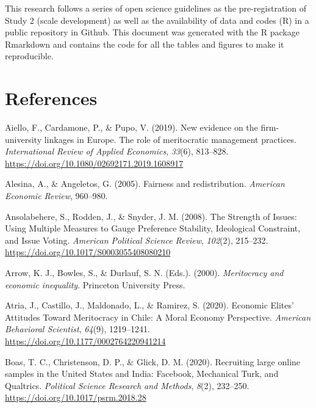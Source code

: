 \documentclass[
  10pt,
  a4paper,
]{article}
\newlength{\cslhangindent}
\newenvironment{CSLReferences}[2] %
 {\begin{list}{}{%
  \setlength{\itemindent}{0pt}
  \setlength{\leftmargin}{0pt}
  \setlength{\parsep}{0pt}
  \ifodd #1
   \setlength{\leftmargin}{\cslhangindent}
   \setlength{\itemindent}{-1\cslhangindent}
  \fi
  \setlength{\itemsep}{#2\baselineskip}}}
 {\end{list}}
\begin{document}
This research follows a series of open science guidelines as the pre-registration of Study 2 (scale development) as well as the availability of data and codes (R) in a public repository in Github. This document was generated with the R package Rmarkdown and contains the code for all the tables and figures to make it reproducible.

\section{References}\label{references}

\label{refs}
\begin{CSLReferences}{1}{0}
Aiello, F., Cardamone, P., \& Pupo, V. (2019). New evidence on the firm-university linkages in {Europe}. {The} role of meritocratic management practices. \emph{International Review of Applied Economics}, \emph{33}(6), 813--828. \url{https://doi.org/10.1080/02692171.2019.1608917}

Alesina, A., \& Angeletos, G. (2005). Fairness and redistribution. \emph{American Economic Review}, 960--980.

Ansolabehere, S., Rodden, J., \& Snyder, J. M. (2008). The {Strength} of {Issues}: {Using Multiple Measures} to {Gauge Preference Stability}, {Ideological Constraint}, and {Issue Voting}. \emph{American Political Science Review}, \emph{102}(2), 215--232. \url{https://doi.org/10.1017/S0003055408080210}

Arrow, K. J., Bowles, S., \& Durlauf, S. N. (Eds.). (2000). \emph{Meritocracy and economic inequality}. {Princeton University Press}.

Atria, J., Castillo, J., Maldonado, L., \& Ramirez, S. (2020). Economic {Elites}' {Attitudes Toward Meritocracy} in {Chile}: {A Moral Economy Perspective}. \emph{American Behavioral Scientist}, \emph{64}(9), 1219--1241. \url{https://doi.org/10.1177/0002764220941214}

Boas, T. C., Christenson, D. P., \& Glick, D. M. (2020). Recruiting large online samples in the {United States} and {India}: {Facebook}, {Mechanical Turk}, and {Qualtrics}. \emph{Political Science Research and Methods}, \emph{8}(2), 232--250. \url{https://doi.org/10.1017/psrm.2018.28}


\end{CSLReferences}
\end{document}
